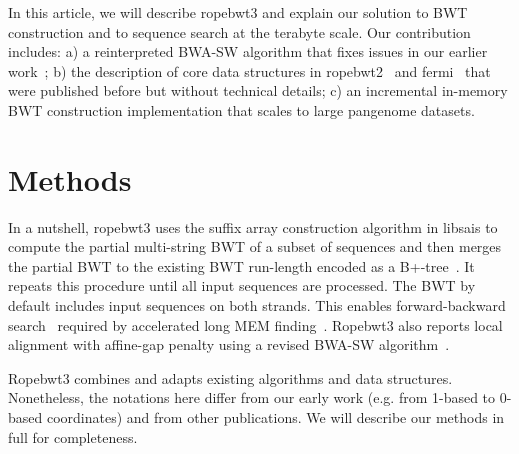 \documentclass[webpdf,contemporary,large,namedate]{oup-authoring-template}%
\begin{document}
In this article, we will describe ropebwt3 and explain our solution to BWT construction
and to sequence search at the terabyte scale.
Our contribution includes:
a) a reinterpreted BWA-SW algorithm that fixes issues in our earlier work~\citep{Li:2010fk};
b) the description of core data structures in ropebwt2~\citep{Li:2014ab} and fermi~\citep{Li:2012fk} that were published before but without technical details;
c) an incremental in-memory BWT construction implementation that scales to large pangenome datasets.

\section{Methods}

In a nutshell, ropebwt3 uses the suffix array construction algorithm in libsais to compute the partial multi-string BWT of a subset of sequences
and then merges the partial BWT to the existing BWT run-length encoded as a B+-tree~\citep{Li:2014ab}.
It repeats this procedure until all input sequences are processed.
The BWT by default includes input sequences on both strands.
This enables forward-backward search~\citep{Li:2012fk} required by accelerated long MEM finding~\citep{DBLP:conf/dlt/Gagie24}.
Ropebwt3 also reports local alignment with affine-gap penalty using a revised BWA-SW algorithm~\citep{Li:2010fk}.

Ropebwt3 combines and adapts existing algorithms and data structures.
Nonetheless, the notations here differ from our early work (e.g. from 1-based to 0-based coordinates) and from other publications.
We will describe our methods in full for completeness.
\end{document}
